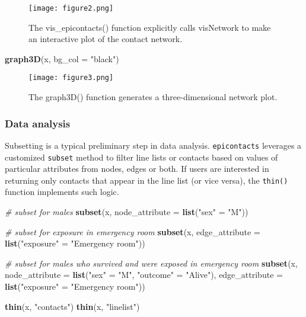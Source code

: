 \documentclass[9pt,a4paper,]{extarticle}
\newenvironment{Shaded}{\begin{snugshade}}{\end{snugshade}}
\newcommand{\KeywordTok}[1]{\textcolor[rgb]{0.13,0.29,0.53}{\textbf{#1}}}
\newcommand{\DataTypeTok}[1]{\textcolor[rgb]{0.13,0.29,0.53}{#1}}
\newcommand{\StringTok}[1]{\textcolor[rgb]{0.31,0.60,0.02}{#1}}
\newcommand{\CommentTok}[1]{\textcolor[rgb]{0.56,0.35,0.01}{\textit{#1}}}
\newcommand{\NormalTok}[1]{#1}
\theoremstyle{definition}
\theoremstyle{definition}
\theoremstyle{definition}
\theoremstyle{remark}
\begin{document}
\begin{figure}
\centering
\texttt{[image: figure2.png]}
\caption{The vis\_epicontacts() function explicitly calls visNetwork to make an interactive plot of the contact network.}
\end{figure}

\begin{Shaded}
\begin{Highlighting}[]
\KeywordTok{graph3D}\NormalTok{(x, }\DataTypeTok{bg_col =} \StringTok{"black"}\NormalTok{)}
\end{Highlighting}
\end{Shaded}

\begin{figure}
\centering
\texttt{[image: figure3.png]}
\caption{The graph3D() function generates a three-dimensional network plot.}
\end{figure}

\subsubsection{Data analysis}\label{data-analysis}

Subsetting is a typical preliminary step in data analysis. \texttt{epicontacts} leverages a customized \texttt{subset} method to filter line lists or contacts based on values of particular attributes from nodes, edges or both. If users are interested in returning only contacts that appear in the line list (or vice versa), the \texttt{thin()} function implements such logic.

\begin{Shaded}
\begin{Highlighting}[]
\CommentTok{# subset for males}
\KeywordTok{subset}\NormalTok{(x, }\DataTypeTok{node_attribute =} \KeywordTok{list}\NormalTok{(}\StringTok{"sex"}\NormalTok{ =}\StringTok{ "M"}\NormalTok{))}

\CommentTok{# subset for exposure in emergency room}
\KeywordTok{subset}\NormalTok{(x, }\DataTypeTok{edge_attribute =} \KeywordTok{list}\NormalTok{(}\StringTok{"exposure"}\NormalTok{ =}\StringTok{ "Emergency room"}\NormalTok{))}

\CommentTok{# subset for males who survived and were exposed in emergency room}
\KeywordTok{subset}\NormalTok{(x,}
       \DataTypeTok{node_attribute =} \KeywordTok{list}\NormalTok{(}\StringTok{"sex"}\NormalTok{ =}\StringTok{ "M"}\NormalTok{, }\StringTok{"outcome"}\NormalTok{ =}\StringTok{ "Alive"}\NormalTok{),}
       \DataTypeTok{edge_attribute =} \KeywordTok{list}\NormalTok{(}\StringTok{"exposure"}\NormalTok{ =}\StringTok{ "Emergency room"}\NormalTok{))}

\KeywordTok{thin}\NormalTok{(x, }\StringTok{"contacts"}\NormalTok{)}
\KeywordTok{thin}\NormalTok{(x, }\StringTok{"linelist"}\NormalTok{)  }
\end{Highlighting}
\end{Shaded}
\end{document}
